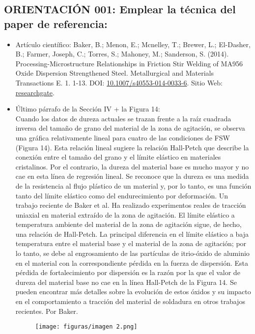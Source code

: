 \documentclass[12pt,a4paper]{article}
\begin{document}
    \subsection{ORIENTACIÓN 001: Emplear la técnica del paper de referencia:}
    \begin{itemize}
        \item Artículo científico:  Baker, B.; Menon, E.; Mcnelley, T.; Brewer, L.; El-Dasher, B.; Farmer, Joseph, C.; Torres, S.; Mahoney, M.; Sanderson, S. (2014). Processing-Microstructure Relationships in Friction Stir Welding of MA956 Oxide Dispersion Strengthened Steel. Metallurgical and Materials Transactions E. 1. 1-13. DOI: \href{http://dx.doi.org/10.1007/s40553-014-0033-6}{10.1007/s40553-014-0033-6}. Sitio Web: \href{https://www.researchgate.net/publication/305807425_Processing-Microstructure_Relationships_in_Friction_Stir_Welding_of_MA956_Oxide_Dispersion_Strengthened_Steel#fullTextFileContent}{researchgate}.
        \item Último párrafo de la Sección IV + la Figura 14:\\
        Cuando los datos de dureza actuales se trazan frente a la raíz cuadrada inversa del tamaño de grano del material de la zona de agitación, se observa una gráfica relativamente lineal para cuatro de las condiciones de FSW (Figura 14). Esta relación lineal sugiere la relación Hall-Petch que describe la conexión entre el tamaño del grano y el límite elástico en materiales cristalinos. Por el contrario, la dureza del material base es mucho mayor y no cae en esta línea de regresión lineal. Se reconoce que la dureza es una medida de la resistencia al flujo plástico de un material y, por lo tanto, es una función tanto del límite elástico como del endurecimiento por deformación. Un trabajo reciente de Baker et al. Ha realizado experimentos reales de tracción uniaxial en material extraído de la zona de agitación. El límite elástico a temperatura ambiente del material de la zona de agitación sigue, de hecho, una relación de Hall-Petch. La principal diferencia en el límite elástico a baja temperatura entre el material base y el material de la zona de agitación; por lo tanto, se debe al engrosamiento de las partículas de itrio-óxido de aluminio en el material con la correspondiente pérdida en la fuerza de dispersión. Esta pérdida de fortalecimiento por dispersión es la razón por la que el valor de dureza del material base no cae en la línea Hall-Petch de la Figura 14. Se pueden encontrar más detalles sobre la evolución de estos óxidos y su impacto en el comportamiento a tracción del material de soldadura en otros trabajos recientes. Por Baker.
            \begin{figure}[h]
                \centering
                \texttt{[image: figuras/imagen 2.png]}
                \label{figura2}
            \end{figure}
    \end{itemize}
\end{document}

